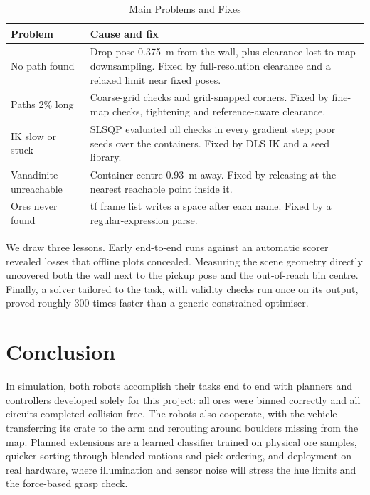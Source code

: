 \documentclass[conference]{IEEEtran}
\begin{document}
\begin{table}[htbp]
\caption{Main Problems and Fixes}
\begin{center}
\begin{tabular}{|p{2.3cm}|p{5.4cm}|}
\hline
\textbf{Problem} & \textbf{Cause and fix} \\
\hline
No path found & Drop pose 0.375~m from the wall, plus clearance lost to map downsampling. Fixed by full-resolution clearance and a relaxed limit near fixed poses. \\
\hline
Paths 2\% long & Coarse-grid checks and grid-snapped corners. Fixed by fine-map checks, tightening and reference-aware clearance. \\
\hline
IK slow or stuck & SLSQP evaluated all checks in every gradient step; poor seeds over the containers. Fixed by DLS IK and a seed library. \\
\hline
Vanadinite unreachable & Container centre 0.93~m away. Fixed by releasing at the nearest reachable point inside it. \\
\hline
Ores never found & tf frame list writes a space after each name. Fixed by a regular-expression parse. \\
\hline
\end{tabular}
\label{tab:issues}
\end{center}
\end{table}

We draw three lessons. Early end-to-end runs against an automatic scorer revealed losses that offline plots concealed. Measuring the scene geometry directly uncovered both the wall next to the pickup pose and the out-of-reach bin centre. Finally, a solver tailored to the task, with validity checks run once on its output, proved roughly 300 times faster than a generic constrained optimiser.

\section{Conclusion}
In simulation, both robots accomplish their tasks end to end with planners and controllers developed solely for this project: all ores were binned correctly and all circuits completed collision-free. The robots also cooperate, with the vehicle transferring its crate to the arm and rerouting around boulders missing from the map. Planned extensions are a learned classifier trained on physical ore samples, quicker sorting through blended motions and pick ordering, and deployment on real hardware, where illumination and sensor noise will stress the hue limits and the force-based grasp check.
\end{document}
